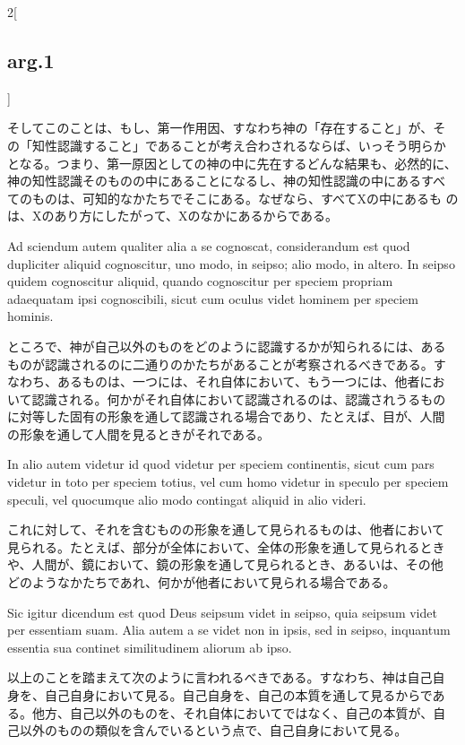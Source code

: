 \documentclass[paper=a4paper,fontsize=10pt,jafontsize=9pt,titlepage]{jlreq}
\begin{document}
\begin{paracol}{2}[\subsection{arg.1}]
\switchcolumn

そしてこのことは、もし、第一作用因、すなわち神の「存在すること」が、そ
の「知性認識すること」であることが考え合わされるならば、いっそう明らか
となる。つまり、第一原因としての神の中に先在するどんな結果も、必然的に、
神の知性認識そのものの中にあることになるし、神の知性認識の中にあるすべ
てのものは、可知的なかたちでそこにある。なぜなら、すべてXの中にあるも
のは、Xのあり方にしたがって、Xのなかにあるからである。

\switchcolumn*

Ad sciendum autem qualiter alia a se cognoscat, considerandum est quod
dupliciter aliquid cognoscitur, uno modo, in seipso; alio modo, in
altero. In seipso quidem cognoscitur aliquid, quando cognoscitur per
speciem propriam adaequatam ipsi cognoscibili, sicut cum oculus videt
hominem per speciem hominis.

\switchcolumn

ところで、神が自己以外のものをどのように認識するかが知られるには、ある
ものが認識されるのに二通りのかたちがあることが考察されるべきである。す
なわち、あるものは、一つには、それ自体において、もう一つには、他者にお
いて認識される。何かがそれ自体において認識されるのは、認識されうるもの
に対等した固有の形象を通して認識される場合であり、たとえば、目が、人間
の形象を通して人間を見るときがそれである。

\switchcolumn*

In alio autem videtur id quod videtur per speciem continentis, sicut
cum pars videtur in toto per speciem totius, vel cum homo videtur in
speculo per speciem speculi, vel quocumque alio modo contingat aliquid
in alio videri.

\switchcolumn

これに対して、それを含むものの形象を通して見られるものは、他者において
見られる。たとえば、部分が全体において、全体の形象を通して見られるとき
や、人間が、鏡において、鏡の形象を通して見られるとき、あるいは、その他
どのようなかたちであれ、何かが他者において見られる場合である。

\switchcolumn*

Sic igitur dicendum est quod Deus seipsum videt in seipso, quia
seipsum videt per essentiam suam. Alia autem a se videt non in ipsis,
sed in seipso, inquantum essentia sua continet similitudinem aliorum
ab ipso.

\switchcolumn

以上のことを踏まえて次のように言われるべきである。すなわち、神は自己自
身を、自己自身において見る。自己自身を、自己の本質を通して見るからであ
る。他方、自己以外のものを、それ自体においてではなく、自己の本質が、自
己以外のものの類似を含んでいるという点で、自己自身において見る。


\end{paracol}
\end{document}
